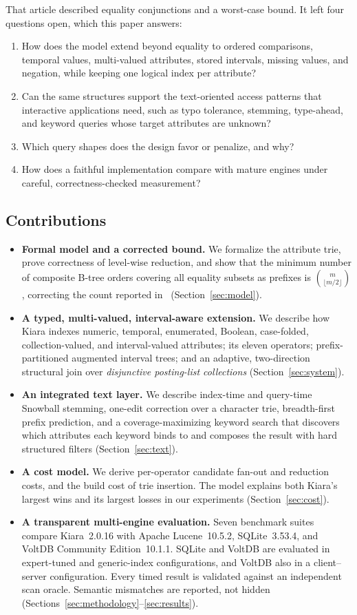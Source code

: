 That article described equality conjunctions and a worst-case bound. It left four questions open, which this paper answers:
\begin{enumerate}
\item How does the model extend beyond equality to ordered comparisons, temporal values, multi-valued attributes, stored intervals, missing values, and negation, while keeping one logical index per attribute?
\item Can the same structures support the text-oriented access patterns that interactive applications need, such as typo tolerance, stemming, type-ahead, and keyword queries whose target attributes are unknown?
\item Which query shapes does the design favor or penalize, and why?
\item How does a faithful implementation compare with mature engines under careful, correctness-checked measurement?
\end{enumerate}

\subsection{Contributions}
\begin{itemize}
\item \textbf{Formal model and a corrected bound.} We formalize the attribute trie, prove correctness of level-wise reduction, and show that the minimum number of composite B-tree orders covering all equality subsets as prefixes is $\binom{m}{\lfloor m/2\rfloor}$, correcting the count reported in~\cite{kapoor2020efficient} (Section~\ref{sec:model}).
\item \textbf{A typed, multi-valued, interval-aware extension.} We describe how Kiara indexes numeric, temporal, enumerated, Boolean, case-folded, collection-valued, and interval-valued attributes; its eleven operators; prefix-partitioned augmented interval trees; and an adaptive, two-direction structural join over \emph{disjunctive posting-list collections} (Section~\ref{sec:system}).
\item \textbf{An integrated text layer.} We describe index-time and query-time Snowball stemming, one-edit correction over a character trie, breadth-first prefix prediction, and a coverage-maximizing keyword search that discovers which attributes each keyword binds to and composes the result with hard structured filters (Section~\ref{sec:text}).
\item \textbf{A cost model.} We derive per-operator candidate fan-out and reduction costs, and the build cost of trie insertion. The model explains both Kiara's largest wins and its largest losses in our experiments (Section~\ref{sec:cost}).
\item \textbf{A transparent multi-engine evaluation.} Seven benchmark suites compare Kiara~2.0.16 with Apache Lucene~10.5.2, SQLite~3.53.4, and VoltDB Community Edition~10.1.1. SQLite and VoltDB are evaluated in expert-tuned and generic-index configurations, and VoltDB also in a client--server configuration. Every timed result is validated against an independent scan oracle. Semantic mismatches are reported, not hidden (Sections~\ref{sec:methodology}--\ref{sec:results}).
\end{itemize}


